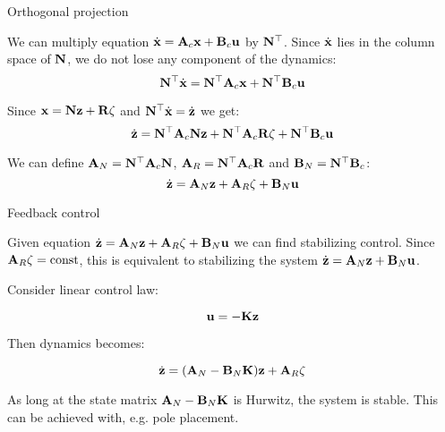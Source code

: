 \documentclass{beamer}
\begin{document}
\begin{frame}{Orthogonal projection}
	\begin{flushleft}
		
		We can multiply equation $\dot{\mathbf{x}}=\mathbf{A}_c\mathbf{x}+\mathbf{B}_c\mathbf{u}$ by $\mathbf{N}^\top$. Since $\dot{\mathbf{x}}$ lies in the column space of $\mathbf{N}$, we do not lose any component of the dynamics:
		\begin{equation}
			\mathbf{N}^\top\dot{\mathbf{x}}=\mathbf{N}^\top\mathbf{A}_c\mathbf{x}+\mathbf{N}^\top\mathbf{B}_c\mathbf{u}
		\end{equation}
	
		Since $\mathbf{x} = \mathbf{N} \mathbf{z} + \mathbf{R} \zeta$ and $\mathbf{N}^\top \dot{\mathbf{x}} = \dot{\mathbf{z}}$ we get:
		\begin{equation}
			\dot{\mathbf{z}}=\mathbf{N}^\top\mathbf{A}_c\mathbf{N} \mathbf{z} + \mathbf{N}^\top\mathbf{A}_c\mathbf{R} \zeta+\mathbf{N}^\top\mathbf{B}_c\mathbf{u}
		\end{equation}
		
		We can define $\mathbf{A}_N = \mathbf{N}^\top\mathbf{A}_c\mathbf{N}$, $\mathbf{A}_R = \mathbf{N}^\top\mathbf{A}_c\mathbf{R}$ and $\mathbf{B}_N = \mathbf{N}^\top\mathbf{B}_c$:
		\begin{equation}
			\dot{\mathbf{z}}=\mathbf{A}_N\mathbf{z} + \mathbf{A}_R \zeta+\mathbf{B}_N\mathbf{u}
		\end{equation}
		
		
		
	\end{flushleft}
\end{frame}




\begin{frame}{Feedback control}
	\begin{flushleft}
		
		Given equation $\dot{\mathbf{z}}=\mathbf{A}_N\mathbf{z} + \mathbf{A}_R \zeta+\mathbf{B}_N\mathbf{u}$ we can find stabilizing control. Since $\mathbf{A}_R \zeta = \text{const}$, this is equivalent to stabilizing the system $\dot{\mathbf{z}}=\mathbf{A}_N\mathbf{z} + \mathbf{B}_N\mathbf{u}$.
		
		\bigskip
		
		Consider linear control law:
		
		\begin{equation}
			\mathbf{u} = -\mathbf{K}\mathbf{z}
		\end{equation}
		
		Then dynamics becomes:
		
		\begin{equation}
			\dot{\mathbf{z}}=(\mathbf{A}_N - \mathbf{B}_N\mathbf{K})\mathbf{z} + \mathbf{A}_R \zeta
		\end{equation}
	
		As long at the state matrix $\mathbf{A}_N - \mathbf{B}_N\mathbf{K}$ is Hurwitz, the system is stable. This can be achieved with, e.g. pole placement.
	
	\end{flushleft}
\end{frame}
\end{document}
